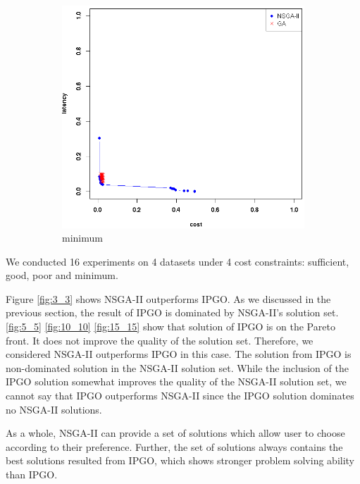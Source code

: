 \documentclass{llncs}
\begin{document}
\begin{figure}[H]
\begin{subfigure}[b]{0.3\textwidth}
		\includegraphics[width=\textwidth]{pics/pop_50_gen_50_15_times_15_minimum.png}
		\caption{minimum}
	\end{subfigure}

	\caption{}\label{fig:condition}
\end{figure}



We conducted 16 experiments on 4 datasets under 4 cost constraints: sufficient, good, poor and minimum. 

Figure \ref{fig:3_3} shows NSGA-II outperforms IPGO. As we discussed in the previous section, the 
result of IPGO is dominated by NSGA-II's solution set. \ref{fig:5_5} \ref{fig:10_10} \ref{fig:15_15} show that solution of IPGO is on the Pareto front. It does not improve the quality of the solution
set. Therefore, we considered NSGA-II outperforms IPGO in this case. The solution from IPGO is non-dominated solution in the NSGA-II solution set. While the inclusion
of the IPGO solution somewhat improves the quality of the NSGA-II solution set, we cannot say that IPGO outperforms NSGA-II since the 
IPGO solution dominates no NSGA-II solutions.

As a whole, NSGA-II can provide a set of solutions which allow user to choose according to their preference. Further, the set of 
solutions always contains the best solutions resulted from IPGO, which shows stronger problem solving ability than IPGO.
\end{document}
